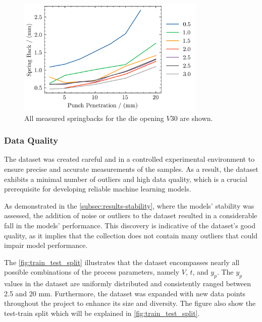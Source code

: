 \begin{figure}[h]
    \begin{tcolorbox}[arc=0pt,boxrule=0.5pt]
        \centering
        \includegraphics[width=0.8\textwidth]{chap4/images/all-springbacks-consolidated}
    \end{tcolorbox}
    \caption{All measured springbacks for the die opening $V30$ are shown. }
    \label{fig:v30_springbacks}
\end{figure}

\subsubsection{Data Quality}
The dataset was created careful and in a controlled experimental environment to ensure precise and accurate
measurements of the samples.
As a result, the dataset exhibits a minimal number of outliers and high data quality, which is a crucial prerequisite
for developing reliable machine learning models.

As demonstrated in the \cref{subsec:results-stability}, where the models' stability was assessed, the
addition of noise or outliers to the dataset resulted in a considerable fall in the models' performance.
This discovery is indicative of the dataset's good quality, as it implies that the collection does not contain
many outliers that could impair model performance.

The \cref{fig:train_test_split} illustrates that the dataset encompasses nearly all possible combinations of the
process parameters, namely $V$, $t$, and $y_p$.
The $y_p$ values in the dataset are uniformly distributed and consistently ranged between 2.5 and 20 mm.
Furthermore, the dataset was expanded with new data points throughout the project to enhance its size and
diversity.
The figure also show the test-train split which will be explained in \cref{fig:train_test_split}.

